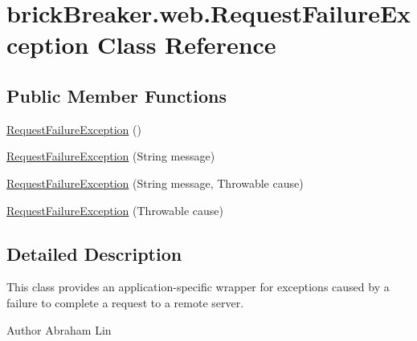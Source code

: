 \hypertarget{classbrick_breaker_1_1web_1_1_request_failure_exception}{
\section{brickBreaker.web.RequestFailureException Class Reference}
\label{classbrick_breaker_1_1web_1_1_request_failure_exception}
}
\subsection*{Public Member Functions}
\begin{DoxyCompactItemize}
\item 
\hyperlink{classbrick_breaker_1_1web_1_1_request_failure_exception_aabe6d2ef76adb37a25d7d828be02fb3f}{RequestFailureException} ()
\item 
\hyperlink{classbrick_breaker_1_1web_1_1_request_failure_exception_ac88ada25c67073741864d896fc6192a7}{RequestFailureException} (String message)
\item 
\hyperlink{classbrick_breaker_1_1web_1_1_request_failure_exception_ab61c4dda3a1de78730729cd4b42d6863}{RequestFailureException} (String message, Throwable cause)
\item 
\hyperlink{classbrick_breaker_1_1web_1_1_request_failure_exception_ab1b4d46e0cfbbe6a3402d6f1d733bd82}{RequestFailureException} (Throwable cause)
\end{DoxyCompactItemize}


\subsection{Detailed Description}
This class provides an application-\/specific wrapper for exceptions caused by a failure to complete a request to a remote server.

\begin{DoxyAuthor}{Author}
Abraham Lin 
\end{DoxyAuthor}


